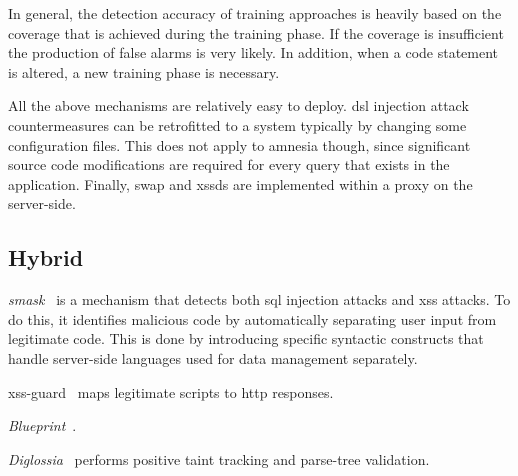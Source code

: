 \documentclass[conference]{IEEEtran}
\begin{document}
In general, the detection accuracy of training approaches is
heavily based on the coverage that is achieved during the
training phase. If the coverage is insufficient the
production of false alarms is very likely.
In addition, when a code statement is altered, a new
training phase is necessary.

All the above mechanisms are relatively easy to deploy.
{\sc dsl} injection attack countermeasures
can be retrofitted to a system typically by changing
some configuration files. This does not apply
to {\sc amnesia} though, since significant source code
modifications are required for every query that exists
in the application. Finally, {\sc swap} and {\sc xssds}
are implemented within a proxy on the server-side.

\subsection{Hybrid}
\label{sec:hybrid}

{\it {\sc sm}ask}~\cite{JB07} is a mechanism that detects
both {\sc sql} injection attacks and {\sc xss} attacks.
To do this, it identifies malicious
code by automatically separating user input from legitimate code.
This is done by introducing specific syntactic constructs
that handle server-side languages used for data management
separately.

{\sc xss-guard}~\cite{BV08}
maps legitimate scripts to {\sc http} responses.

{\it Blueprint}~\cite{LV09}.

{\it Diglossia}~\cite{SMS13} performs positive taint tracking and
parse-tree validation.
\end{document}
